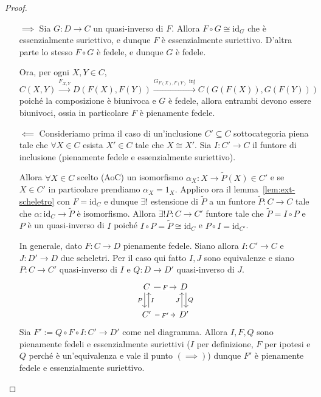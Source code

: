 \begin{proof}\( \)
\begin{itemize}
    \item[\(\implies \)] Sia \(G : D \to C\) un quasi-inverso di \(F\). Allora
        \(F \circ G \cong \mathrm{id}_G\) che è essenzialmente suriettivo, e
        dunque \(F\) è essenzialmente suriettivo. D'altra parte lo stesso \(F
        \circ G\) è fedele, e dunque \(G\) è fedele.
        
        Ora, per ogni \(X, Y \in C\),
        \[
          C{(X, Y)} \overset{F_{X,Y} }{\to } D{(F{(X)}, F{(Y)})} \overset{G_{F{(X)}, F{(Y)}}  \text{ inj}}{\to} C{(G{(F{(X)})}, G{(F{(Y)})})}
        \]
        poiché la composizione è biunivoca e \(G\) è fedele, allora entrambi
        devono essere biunivoci, ossia in particolare \(F\) è pienamente fedele.
    \item[\(\impliedby \)] Consideriamo prima il caso di un'inclusione \(C' \subseteq C \) sottocategoria piena tale che \(\forall X \in C\) esista \(X' \in C\) tale che \(X \cong X'\). 
        Sia \(I : C' \to C\) il funtore di inclusione (pienamente fedele e
        essenzialmente suriettivo).

        Allora \(\forall X \in C\) scelto (AoC) un
        isomorfismo \(\alpha_X : X \to \tilde{P}{(X)} \in C'\) e se \(X \in 
        C'\) in particolare prendiamo \(\alpha_X = 1_X\). Applico ora il
        lemma~\ref{lem:ext-scheletro} con \(F = \mathrm{id}_C\) e dunque \(\exists !\) estensione di \(\tilde{P}\) a un funtore \(\tilde{P} : C \to C\) tale che \(\alpha : \mathrm{id}_C \to \tilde{P}\) è isomorfismo. Allora \(\exists ! P : C \to C'\) funtore tale che \(\tilde{P} = I \circ P\) e \(P\) è un quasi-inverso di \(I\) poiché \(I \circ P = \tilde{P} \cong \mathrm{id}_C\) e \(P \circ I = \mathrm{id}_{C'}\).

        In generale, dato \(F : C \to D\) pienamente fedele. Siano allora \(
        I : C' \to C\) e \(J : D' \to D\) due scheletri. Per il caso qui fatto
        \(I, J\) sono equivalenze e siano \(P : C\to C'\) quasi-inverso di \(I\) e \(Q : D \to D'\) quasi-inverso di \(J\).
\[\begin{tikzcd}
	C & D \\
	{C'} & {D'}
	\arrow["F"{description}, from=1-1, to=1-2]
	\arrow["P"', shift right, from=1-1, to=2-1]
	\arrow["Q", shift left, from=1-2, to=2-2]
	\arrow["I"', shift right, from=2-1, to=1-1]
	\arrow["{F'}"{description}, from=2-1, to=2-2]
	\arrow["J", shift left, from=2-2, to=1-2]
\end{tikzcd}\]
    Sia \(F' := Q \circ F \circ I : C' \to D'\) come nel diagramma. Allora \(
    I, F, Q\) sono pienamente fedeli e essenzialmente suriettivi (\(I\) per
    definizione, \(F\) per ipotesi e \(Q\) perché è un'equivalenza e vale il
    punto \({(\implies )}\)) dunque \(
    F'\) è pienamente fedele e essenzialmente suriettivo.


\end{itemize}
\end{proof}
